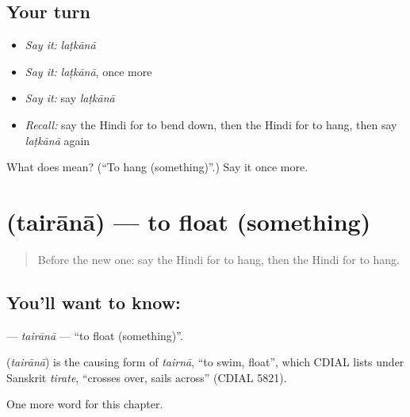 \subsection*{Your turn}
\begin{itemize}
\raggedright
  \item \emph{Say it:} \emph{laṭkānā}
  \item \emph{Say it:} \emph{laṭkānā}, once more
  \item \emph{Say it:} say \emph{laṭkānā}
  \item \emph{Recall:} say the Hindi for to bend down, then the Hindi for to hang, then say \emph{laṭkānā} again
\end{itemize}

\begin{tcolorbox}[breakable,colback=teal!4,colframe=teal!35!black,title={Before you move on}]
What does  mean? (\textquotedblleft{}To hang (something)\textquotedblright{}.) Say it once more.
\end{tcolorbox}
\section[\texorpdfstring{\hi{तैराना} (tairānā)}{तैराना (tairānā)}]{ (tairānā) — to float (something)}

\label{lesson:HI-C230-tairana}



\begin{quote}
Before the new one: say the Hindi for to hang, then the Hindi for to hang.
\end{quote}

\subsection*{You'll want to know: }
\textbf{} — \emph{tairānā} — \textquotedblleft{}to float (something)\textquotedblright{}.

\begin{cousinweb}
\textbf{} (\emph{tairānā}) is the causing form of \emph{tairnā}, \textquotedblleft{}to swim, float\textquotedblright{}, which CDIAL lists under Sanskrit \emph{tirate}, \textquotedblleft{}crosses over, sails across\textquotedblright{} (CDIAL 5821).
\end{cousinweb}

\begin{grammarlens}[title={What you've built}]
One more word for this chapter.
\end{grammarlens}

